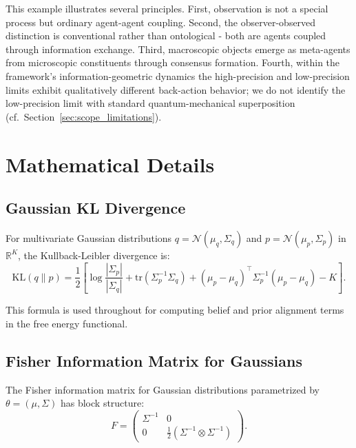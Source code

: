 \documentclass[11pt]{article}
\begin{document}
This example illustrates several principles. First, observation is not a special process but ordinary agent-agent coupling. Second, the observer-observed distinction is conventional rather than ontological - both are agents coupled through information exchange. Third, macroscopic objects emerge as meta-agents from microscopic constituents through consensus formation. Fourth, within the framework's information-geometric dynamics the high-precision and low-precision limits exhibit qualitatively different back-action behavior; we do not identify the low-precision limit with standard quantum-mechanical superposition (cf.\ Section~\ref{sec:scope_limitations}).

\section{Mathematical Details}
\label{app:math}

\subsection{Gaussian KL Divergence}
\label{app:gaussian_kl}

For multivariate Gaussian distributions $q = \mathcal{N}(\mu_q, \Sigma_q)$ and $p = \mathcal{N}(\mu_p, \Sigma_p)$ in $\mathbb{R}^K$, the Kullback-Leibler divergence is:
\begin{equation}
\mathrm{KL}(q \| p) = \frac{1}{2}\left[\log\frac{|\Sigma_p|}{|\Sigma_q|} + \mathrm{tr}(\Sigma_p^{-1}\Sigma_q) + (\mu_p - \mu_q)^\top\Sigma_p^{-1}(\mu_p - \mu_q) - K\right].
\end{equation}

This formula is used throughout for computing belief and prior alignment terms in the free energy functional.

\subsection{Fisher Information Matrix for Gaussians}
\label{app:fisher_gaussian}

The Fisher information matrix for Gaussian distributions parametrized by $\theta = (\mu, \Sigma)$ has block structure:
\begin{equation}
F = \begin{pmatrix}
\Sigma^{-1} & 0 \\
0 & \frac{1}{2}(\Sigma^{-1} \otimes \Sigma^{-1})
\end{pmatrix}.
\end{equation}
\end{document}
